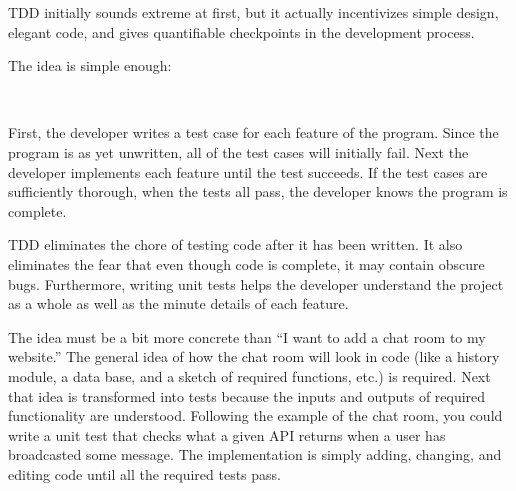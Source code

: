 TDD initially sounds extreme at first, but it actually incentivizes simple design, elegant code, and gives quantifiable checkpoints in the development process.

The idea is simple enough:
\begin{center}
\\
\end{center}

First, the developer writes a test case for each feature of the program. Since the program is as yet unwritten, all of the test cases will initially fail. Next the developer implements each feature until the test succeeds. If the test cases are sufficiently thorough, when the tests all pass, the developer knows the program is complete.

TDD eliminates the chore of testing code after it has been written. It also eliminates the fear that even though code is complete, it may contain obscure bugs. Furthermore, writing unit tests helps the developer understand the project as a whole as well as the minute details of each feature.

The idea must be a bit more concrete than ``I want to add a chat room to my website.'' The general idea of how the chat room will look in code (like a history module, a data base, and a sketch of required functions, etc.) is required.
Next that idea is transformed into tests because the inputs and outputs of required functionality are understood.
Following the example of the chat room, you could write a unit test that checks what a given API returns when a user has broadcasted some message.
The implementation is simply adding, changing, and editing code until all the required tests pass.

